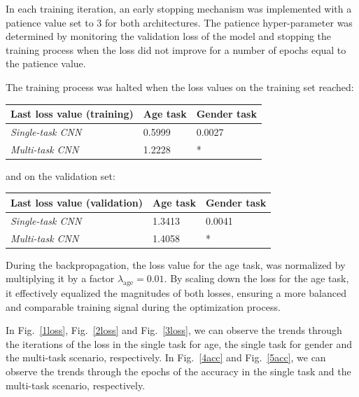 In each training iteration, an early stopping mechanism was implemented with
a patience value set to 3 for both architectures.
The patience hyper-parameter was determined by monitoring the validation loss
of the model and stopping the training process when the loss
did not improve for a number of epochs equal to the patience value.

The training process was halted when the loss values
on the training set reached: 
\begin{table}[H]
    \centering
    \begin{tabular}{@{}lll@{}}
    \toprule
    Last loss value (training) & \textbf{Age task} & \textbf{Gender task} \\ \midrule
    \textit{Single-task CNN} &  0.5999           & 0.0027               \\
    \textit{Multi-task CNN}  &  1.2228           & *                    \\ \bottomrule
    \end{tabular}
\end{table}
and on the validation set:
\begin{table}[H]
    \centering
    \begin{tabular}{@{}lll@{}}
    \toprule
    Last loss value (validation) & \textbf{Age task} & \textbf{Gender task} \\ \midrule
    \textit{Single-task CNN} &  1.3413           & 0.0041               \\
    \textit{Multi-task CNN}  &  1.4058           & *                    \\ \bottomrule
    \end{tabular}
\end{table}
During the backpropagation, the loss value for the age task, 
was normalized by multiplying it by a factor
$\lambda_{\text{age}} = 0.01$.
By scaling down the loss for the age task, it effectively equalized
the magnitudes of both losses, ensuring a more balanced and comparable
training signal during the optimization process. 

In Fig.~\ref{1loss}, Fig.~\ref{2loss} and Fig.~\ref{3loss},
we can observe the trends through the iterations
of the loss
in the single task for age, the single task for gender
and the multi-task scenario, respectively.
In Fig.~\ref{4acc} and Fig.~\ref{5acc}, we can observe the
trends through the epochs of the accuracy
in the single task
and the multi-task scenario, respectively.

